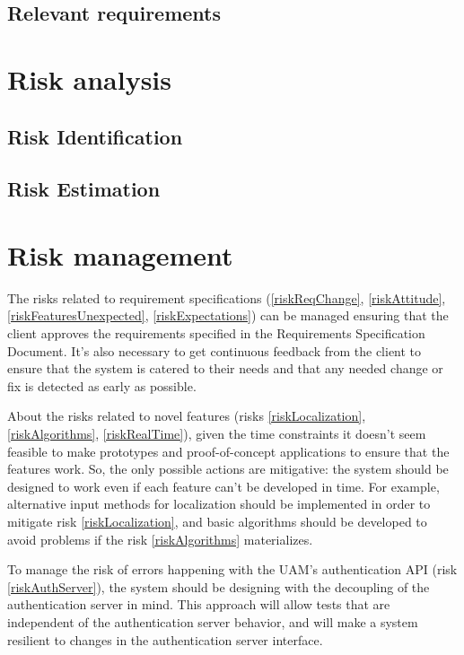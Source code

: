 \documentclass[11pt]{report}
\newcounter{risks}[subsection]
\begin{document}
\section{Relevant requirements}


\chapter{Risk analysis}

\label{chapRiskAnalysis}


\section{Risk Identification}
\label{secRiskIdentification}


\section{Risk Estimation}
\label{secRiskEstimation}


\chapter{Risk management}
\label{chapRiskManagement}

The risks related to requirement specifications (\ref{riskReqChange}, \ref{riskAttitude}, \ref{riskFeaturesUnexpected}, \ref{riskExpectations}) can be managed ensuring that the client approves the requirements specified in the Requirements Specification Document. It's also necessary to get continuous feedback from the client to ensure that the system is catered to their needs and that any needed change or fix is detected as early as possible.

About the risks related to novel features (risks \ref{riskLocalization}, \ref{riskAlgorithms}, \ref{riskRealTime}), given the time constraints it doesn't seem feasible to make prototypes and proof-of-concept applications to ensure that the features work. So, the only possible actions are mitigative: the system should be designed to work even if each feature can't be developed in time. For example, alternative input methods for localization should be implemented in order to mitigate risk \ref{riskLocalization}, and basic algorithms should be developed to avoid problems if the risk \ref{riskAlgorithms} materializes.

To manage the risk of errors happening with the UAM's authentication API (risk \ref{riskAuthServer}), the system should be designing with the decoupling of the authentication server in mind. This approach will allow tests that are independent of the authentication server behavior, and will make a system resilient to changes in the authentication server interface.
\end{document}
